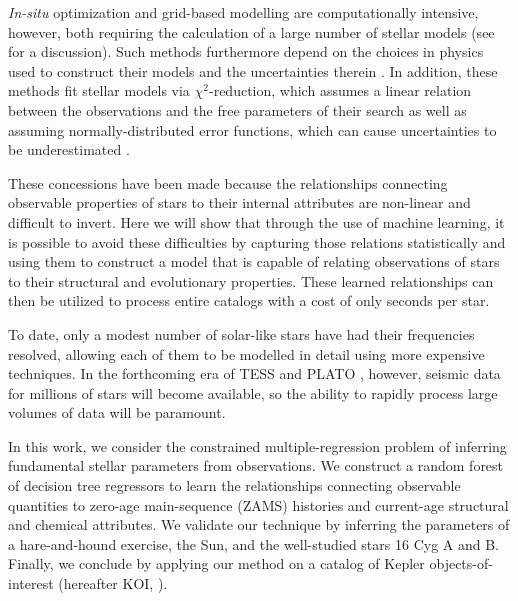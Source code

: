 \documentclass[manuscript]{aastex}
\begin{document}
\emph{In-situ} optimization and grid-based modelling are computationally intensive, however, both requiring the calculation of a large number of stellar models (see \citealt{2009ApJ...699..373M} for a discussion). Such methods furthermore depend on the choices in physics used to construct their models and the uncertainties therein \citep{2014A&A...569A..21L}. In addition, these methods fit stellar models via $\chi^2$-reduction, which assumes a linear relation between the observations and the free parameters of their search as well as assuming normally-distributed error functions, which can cause uncertainties to be underestimated \citep{2010arXiv1012.3754A}.%

These concessions have been made because the relationships connecting observable properties of stars to their internal attributes are non-linear and difficult to invert. Here we will show that through the use of machine learning, it is possible to avoid these difficulties by capturing those relations statistically and using them to construct a model that is capable of relating observations of stars to their structural and evolutionary properties. These learned relationships can then be utilized to process entire catalogs with a cost of only seconds per star. 

To date, only a modest number of solar-like stars have had their frequencies resolved, allowing each of them to be modelled in detail using more expensive techniques. In the forthcoming era of TESS \citep{2015JATIS...1a4003R} and PLATO \citep{2014ExA....38..249R}, however, seismic data for millions of stars will become available, so the ability to rapidly process large volumes of data will be paramount. 

In this work, we consider the constrained multiple-regression problem of inferring fundamental stellar parameters from observations. We construct a random forest of decision tree regressors to learn the relationships connecting observable quantities to zero-age main-sequence (ZAMS) histories and current-age structural and chemical attributes. We validate our technique by inferring the parameters of a hare-and-hound exercise, the Sun, and the well-studied stars 16 Cyg A and B. Finally, we conclude by applying our method on a catalog of Kepler objects-of-interest (hereafter KOI, \citealt{2016MNRAS.456.2183D}).
\end{document}
